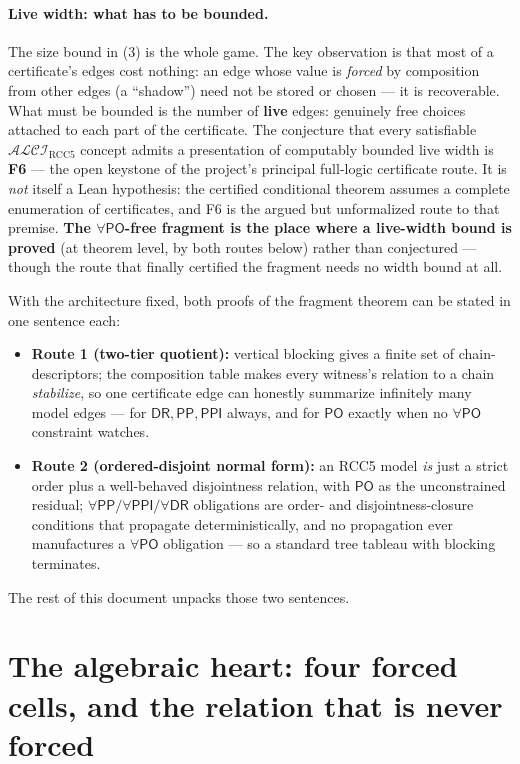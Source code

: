 \documentclass[11pt]{article}
\newcommand{\ALCIRCC}{\ensuremath{\mathcal{ALCI}_{\mathrm{RCC5}}}}
\newcommand{\DR}{\ensuremath{\mathsf{DR}}}
\newcommand{\PO}{\ensuremath{\mathsf{PO}}}
\newcommand{\PP}{\ensuremath{\mathsf{PP}}}
\newcommand{\PPI}{\ensuremath{\mathsf{PPI}}}
\begin{document}
\paragraph{Live width: what has to be bounded.} The size bound in (3)
is the whole game. The key observation is that most of a certificate's
edges cost nothing: an edge whose value is \emph{forced} by composition
from other edges (a ``shadow'') need not be stored or chosen --- it is
recoverable. What must be bounded is the number of \textbf{live} edges:
genuinely free choices attached to each part of the certificate. The
conjecture that every satisfiable $\ALCIRCC$ concept admits a
presentation of computably bounded live width is \textbf{F6} --- the
open keystone of the project's principal full-logic certificate route. It
is \emph{not} itself a Lean hypothesis: the certified conditional theorem
assumes a complete enumeration of certificates, and F6 is the argued but
unformalized route to that premise. \textbf{The $\forall\PO$-free fragment
is the place where a live-width bound is proved} (at theorem level, by
both routes below) rather than conjectured --- though the route that
finally certified the fragment needs no width bound at all.

With the architecture fixed, both proofs of the fragment theorem can be
stated in one sentence each:
\begin{itemize}
\item \textbf{Route 1 (two-tier quotient):} vertical blocking gives a
  finite set of chain-descriptors; the composition table makes every
  witness's relation to a chain \emph{stabilize}, so one certificate
  edge can honestly summarize infinitely many model edges --- for
  $\DR,\PP,\PPI$ always, and for $\PO$ exactly when no $\forall\PO$
  constraint watches.
\item \textbf{Route 2 (ordered-disjoint normal form):} an RCC5 model
  \emph{is} just a strict order plus a well-behaved disjointness
  relation, with $\PO$ as the unconstrained residual;
  $\forall\PP/\forall\PPI/\forall\DR$ obligations are order- and
  disjointness-closure conditions that propagate deterministically, and
  no propagation ever manufactures a $\forall\PO$ obligation --- so a
  standard tree tableau with blocking terminates.
\end{itemize}

The rest of this document unpacks those two sentences.

\section{The algebraic heart: four forced cells, and the relation that
is never forced}\label{sec:algebra}
\end{document}
